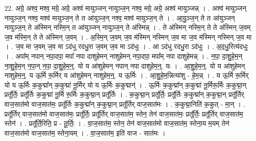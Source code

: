 \documentclass[17pt]{extarticle}
\begin{document}
22. अग्रे॒ अश्व॒ मश्व॒ मग्रे॒ अग्रे॒ अश्व॑ मायुञ्जन् नायुञ्ज॒न् नश्व॒ मग्रे॒ अग्रे॒ अश्व॑ मायुञ्जन्न् । . अश्व॑ मायुञ्जन् नायुञ्ज॒न् नश्व॒ मश्व॑ मायुञ्ज॒न् ते त आ॑युञ्ज॒न् नश्व॒ मश्व॑ मायुञ्ज॒न् ते । . आ॒यु॒ञ्ज॒न् ते त आ॑युञ्जन् नायुञ्ज॒न् ते अ॑स्मिन् नस्मि॒न् त आ॑युञ्जन् नायुञ्ज॒न् ते अ॑स्मिन्न् । . ते अ॑स्मिन् नस्मि॒न् ते ते अ॑स्मिन् ज॒वम् ज॒व म॑स्मि॒न् ते ते अ॑स्मिन् ज॒वम् । . अ॒स्मि॒न् ज॒वम् ज॒व म॑स्मिन् नस्मिन् ज॒व मा ज॒व म॑स्मिन् नस्मिन् ज॒व मा । . ज॒व मा ज॒वम् ज॒व मा ऽद॑धु रदधु॒रा ज॒वम् ज॒व मा ऽद॑धुः । . आ ऽद॑धु रदधु॒रा ऽद॑धुः । . अ॒द॒धु॒रित्य॑दधुः । . अपा᳚म् नपान् नपा॒दपा॒ मपा᳚ नपा दाशुहेमन् नाशुहेमन् नपा॒दपा॒ मपा᳚म् नपा दाशुहेमन्न् । . न॒पा॒ दा॒शु॒हे॒म॒न् ना॒शु॒हे॒म॒न् न॒पा॒न् न॒पा॒ दा॒शु॒हे॒म॒न्॒. यो य आ॑शुहेमन् नपान् नपा दाशुहेम॒न्॒. यः । . आ॒शु॒हे॒म॒न्॒. यो य आ॑शुहेमन् नाशुहेम॒न्॒. य ऊ॒र्मि रू॒र्मिर् य आ॑शुहेमन् नाशुहेम॒न्॒. य ऊ॒र्मिः । . आ॒शु॒हे॒म॒न्नित्या॑शु - हे॒म॒न्न् । . य ऊ॒र्मि रू॒र्मिर् यो य ऊ॒र्मिः क॒कुद्मा᳚न् क॒कुद्मा॑ नू॒र्मिर् यो य ऊ॒र्मिः क॒कुद्मान्॑ । . ऊ॒र्मिः क॒कुद्मा᳚न् क॒कुद्मा॑ नू॒र्मिरू॒र्मिः क॒कुद्मा॒न् प्रतू᳚र्तिः॒ प्रतू᳚र्तिः क॒कुद्मा॑ नू॒र्मि रू॒र्मिः क॒कुद्मा॒न् प्रतू᳚र्तिः । . क॒कुद्मा॒न् प्रतू᳚र्तिः॒ प्रतू᳚र्तिः क॒कुद्मा᳚न् क॒कुद्मा॒न् प्रतू᳚र्तिर् वाज॒सात॑मो वाज॒सात॑मः॒ प्रतू᳚र्तिः क॒कुद्मा᳚न् क॒कुद्मा॒न् प्रतू᳚र्तिर् वाज॒सात॑मः । . क॒कुद्मा॒निति॑ क॒कुत् - मा॒न् । . प्रतू᳚र्तिर् वाज॒सात॑मो वाज॒सात॑मः॒ प्रतू᳚र्तिः॒ प्रतू᳚र्तिर् वाज॒सात॑म॒ स्तेन॒ तेन॑ वाज॒सात॑मः॒ प्रतू᳚र्तिः॒ प्रतू᳚र्तिर् वाज॒सात॑म॒ स्तेन॑ । . प्रतू᳚र्ति॒रिति॒ प्र - तू॒र्तिः॒ । . वा॒ज॒सात॑म॒ स्तेन॒ तेन॑ वाज॒सात॑मो वाज॒सात॑म॒ स्तेना॒य म॒यम् तेन॑ वाज॒सात॑मो वाज॒सात॑म॒ स्तेना॒यम् । . वा॒ज॒सात॑म॒ इति॑ वाज - सात॑मः । \newline
\end{document}
